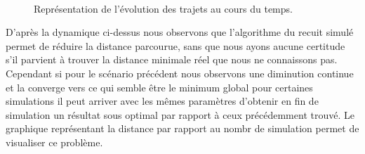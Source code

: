 \documentclass[12pt]{article}
\begin{document}
\begin{figure}[H]
 
    \\
  \caption{Représentation de l'évolution des trajets au cours du temps.}
 \end{figure}


D'après la dynamique ci-dessus nous observons que l'algorithme du recuit simulé permet de réduire la distance parcourue, sans que nous ayons aucune certitude s'il parvient à trouver la distance minimale réel que nous ne connaissons pas. Cependant si pour le scénario précédent nous observons une diminution continue et la converge vers ce qui semble être le minimum global pour certaines simulations il peut arriver avec les mêmes paramètres d'obtenir en fin de simulation un résultat sous optimal par rapport à ceux précédemment trouvé. Le graphique représentant la distance par rapport au nombr de simulation permet de visualiser ce problème.
\end{document}
